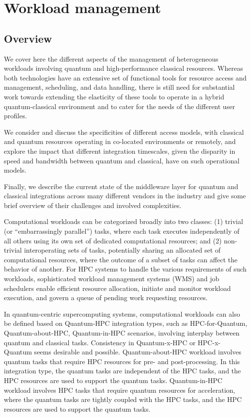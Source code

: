 
\section{Workload management\label{sec:Queuing}}

\subsection{Overview\label{sec:OverviewQueuing}}

We cover here the different aspects of the management of heterogeneous workloads involving quantum and high-performance classical resources. Whereas both technologies have an extensive set of functional tools for resource access and management, scheduling, and data handling, there is still need for substantial work towards extending the elasticity of these tools to operate in a hybrid quantum-classical environment and to cater for the needs of the different user profiles. 

We consider and discuss the specificities of different access models, with classical and quantum resources operating in co-located environments or remotely, and explore the impact that different integration timescales, given the disparity in speed and bandwidth between quantum and classical, have on such operational models.

Finally, we describe the current state of the middleware layer for quantum and classical integrations across many different vendors in the industry and give some brief overview of their challenges and involved complexities.


Computational workloads can be categorized broadly into two classes:
(1) trivial (or ``embarrassingly parallel'') tasks, where each task executes independently of all others using its own set of dedicated computational resources;
and (2) non-trivial interoperating sets of tasks, potentially sharing an allocated set of computational resources, where the outcome of a subset of tasks can affect the behavior of another. For HPC systems to handle the various requirements of such workloads, sophisticated workload management systems (WMS) and job schedulers enable efficient resource allocation, initiate and monitor workload execution, and govern a queue of pending work requesting resources.

In quantum-centric supercomputing systems, computational workloads can also be defined based on Quantum-HPC integration types, such as HPC-for-Quantum, Quantum-about-HPC, Quantum-in-HPC scenarios, involving interplay between quantum and classical tasks. Consistency in Quantum-x-HPC or HPC-x-Quantum seems desirable and possible. Quantum-about-HPC workload involves quantum tasks that require HPC resources for pre- and post-processing. In this integration type, the quantum tasks are independent of the HPC tasks, and the HPC resources are used to support the quantum tasks. Quantum-in-HPC workload involves HPC tasks that require quantum resources for acceleration, where the quantum tasks are tightly coupled with the HPC tasks, and the HPC resources are used to support the quantum tasks. 


